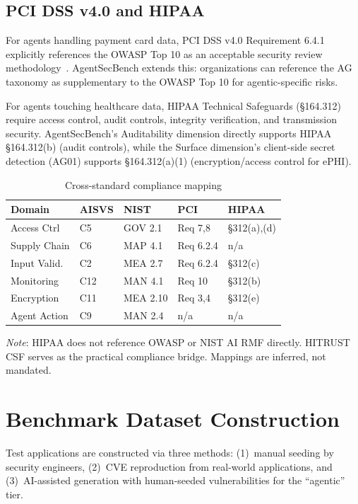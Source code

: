 \documentclass[11pt,twocolumn]{article}
\begin{document}
\subsection{PCI DSS v4.0 and HIPAA}

For agents handling payment card data, PCI DSS v4.0 Requirement 6.4.1 explicitly references the OWASP Top 10 as an acceptable security review methodology~\cite{pcidss2022}. AgentSecBench extends this: organizations can reference the AG taxonomy as supplementary to the OWASP Top 10 for agentic-specific risks.

For agents touching healthcare data, HIPAA Technical Safeguards (\S164.312) require access control, audit controls, integrity verification, and transmission security. AgentSecBench's Auditability dimension directly supports HIPAA \S164.312(b) (audit controls), while the Surface dimension's client-side secret detection (AG01) supports \S164.312(a)(1) (encryption/access control for ePHI).

\begin{table}[H]
\centering
\caption{Cross-standard compliance mapping}
\label{tab:compliance}
\scriptsize
\begin{tabular}{@{}lllll@{}}
\toprule
\textbf{Domain} & \textbf{AISVS} & \textbf{NIST} & \textbf{PCI} & \textbf{HIPAA} \\
\midrule
Access Ctrl & C5 & GOV 2.1 & Req 7,8 & \S312(a),(d) \\
Supply Chain & C6 & MAP 4.1 & Req 6.2.4 & n/a \\
Input Valid. & C2 & MEA 2.7 & Req 6.2.4 & \S312(c) \\
Monitoring & C12 & MAN 4.1 & Req 10 & \S312(b) \\
Encryption & C11 & MEA 2.10 & Req 3,4 & \S312(e) \\
Agent Action & C9 & MAN 2.4 & n/a & n/a \\
\bottomrule
\end{tabular}
\end{table}

\noindent\textit{Note}: HIPAA does not reference OWASP or NIST AI RMF directly. HITRUST CSF serves as the practical compliance bridge. Mappings are inferred, not mandated.

\section{Benchmark Dataset Construction}

Test applications are constructed via three methods: (1)~manual seeding by security engineers, (2)~CVE reproduction from real-world applications, and (3)~AI-assisted generation with human-seeded vulnerabilities for the ``agentic'' tier.
\end{document}
